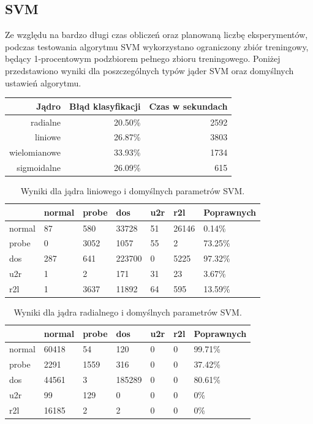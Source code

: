 \documentclass[a4paper, 12pt]{article}
\begin{document}
\subsection{SVM}

Ze względu na bardzo długi czas obliczeń oraz planowaną liczbę eksperymentów, podczas testowania algorytmu SVM wykorzystano ograniczony zbiór treningowy, będący 1-procentowym
podzbiorem pełnego zbioru treningowego. Poniżej przedstawiono wyniki dla poszczególnych typów jąder SVM oraz domyślnych ustawień algorytmu.

\begin{table}[H]
\centering
\begin{tabular}{ | r | r | r | } \hline
Jądro & Błąd klasyfikacji & Czas w sekundach \\ \hline
radialne & 20.50\% & 2592 \\ \hline
liniowe & 26.87\% & 3803 \\ \hline
wielomianowe & 33.93\% & 1734 \\ \hline
sigmoidalne & 26.09\% & 615 \\ \hline
\end{tabular} 
\end{table}

\begin{table}[H]
\centering
\label{table:cm_svm_linear_default}
\begin{tabular}{ | l | l | l | l | l | l | l | } \hline
	& normal &  probe &   dos  &  u2r  & r2l 	& Poprawnych	\\ \hline
 normal  &   87 &  580 & 33728 & 51 & 26146 & 0.14\% \\ \hline
 probe   &    0 &  3052 &  1057 & 55  &   2 & 73.25\% \\ \hline
 dos     &  287 &  641  & 223700 &  0 & 5225 & 97.32\% \\ \hline
 u2r     &    1 &   2   &  171 & 31 &  23 & 3.67\% \\ \hline
 r2l     &   1  & 3637  &  11892 & 64 & 595 & 13.59\% \\ \hline
\end{tabular}
\caption{Wyniki dla jądra liniowego i domyślnych parametrów SVM.}
\end{table}

\begin{table}[H]
\centering
\label{table:cm_svm_radial_default}
\begin{tabular}{ | l | l | l | l | l | l | l | } \hline
	& normal &  probe &   dos  &  u2r  & r2l 	& Poprawnych	\\ \hline
  normal  & 60418  &  54   &  120   &  0 &  0 & 99.71\% \\ \hline
  probe   & 2291   &  1559 &   316  &  0 &  0 & 37.42\% \\ \hline
  dos     & 44561  &    3  & 185289 &  0 &  0 & 80.61\% \\ \hline
  u2r     &    99  & 129   &   0 &   0 &  0 & 0\% \\ \hline
  r2l     & 16185  &    2  &    2 &  0 &  0 & 0\% \\ \hline
\end{tabular} 
\caption{Wyniki dla jądra radialnego i domyślnych parametrów SVM.}
\end{table}
\end{document}
